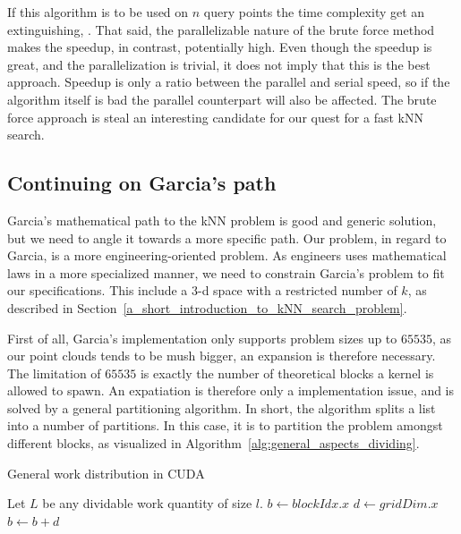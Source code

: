 If this algorithm is to be used on $n$ query points the time complexity get an extinguishing, . That said, the parallelizable nature of the brute force method makes the speedup, in contrast, potentially high. Even though the speedup is great, and the parallelization is trivial, it does not imply that this is the best approach. Speedup is only a ratio between the parallel and serial speed, so if the algorithm itself is bad the parallel counterpart will also be affected. The brute force approach is steal an interesting candidate for our quest for a fast kNN search.


\subsection{Continuing on Garcia's path} %
\label{sub:back_on_the_right_rrack}


Garcia's mathematical path to the kNN problem is good and generic solution, but we need to angle it towards a more specific path. Our problem, in regard to Garcia, is a more engineering-oriented problem. As engineers uses mathematical laws in a more specialized manner, we need to constrain Garcia's problem to fit our specifications. This include a 3-d space with a restricted number of $k$, as described in Section~\ref{a_short_introduction_to_kNN_search_problem}.



First of all, Garcia's implementation only supports problem sizes up to $65535$, as our point clouds tends to be mush bigger, an expansion is therefore necessary. The limitation of $65535$ is exactly the number of theoretical blocks a kernel is allowed to spawn. An expatiation is therefore only a implementation issue, and is solved by a general partitioning algorithm. In short, the algorithm splits a list into a number of partitions. In this case, it is to partition the problem amongst different blocks, as visualized in Algorithm~\ref{alg:general_aspects_dividing}. 

\begin{algorithm}[ht]
\caption{General work distribution in CUDA}
\label{alg:general_aspects_dividing}
\begin{algorithmic}
\State Let $L$ be any dividable work quantity of size $l$.
    \State $b \gets blockIdx.x$ 
    \State $d \gets gridDim.x$ 
    \State {}
    \State $b \gets b + d$
    \EndWhile
    \EndFunction
\end{algorithmic}
\end{algorithm}


